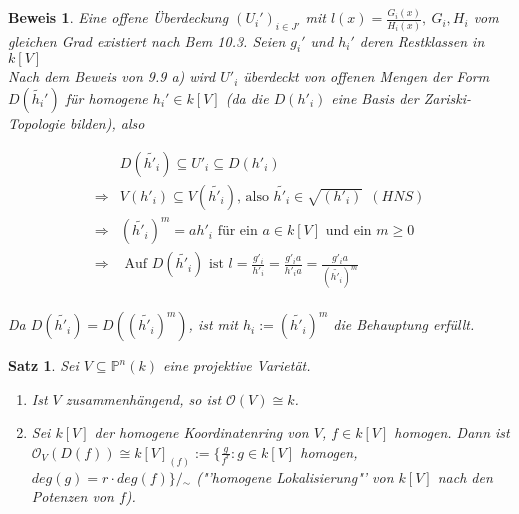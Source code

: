\documentclass[a4paper,12pt]{report}
\theoremstyle{break}
\newtheorem{Satz}{Satz}
\theoremstyle{nonumberbreak}
\theoremstyle{nonumberplain}
\newtheorem{Bew}{Beweis}
\begin{document}
\begin{Bew}
Eine offene Überdeckung $(U_i')_{i\in J'}$ mit $l(x)=\frac{G_i(x)}{H_i(x)},~G_i,H_i$ vom gleichen Grad existiert nach Bem 10.3. Seien $g_i'$ und $h_i'$ deren Restklassen in $k[V]$\\
Nach dem Beweis von 9.9 a) wird $U'_i$ überdeckt von offenen Mengen der Form $D(\tilde{h_i}')$ für homogene $h_i'\in k[V]$ (da die $D(h'_i)$ eine Basis der Zariski-Topologie bilden), also

\begin{align*}
&D(\tilde{h'_i})\subseteq U'_i\subseteq D(h'_i)~\\
\Rightarrow & V(h'_i)\subseteq V(\tilde{h'_i})  \text{, also } \tilde{h'_i}\in\sqrt{(h'_i)} ~~ (HNS)\\
\Rightarrow & (\tilde{h'_i})^m=ah'_i  \text{ für ein } a\in k[V] \text{ und ein } m\geq 0\\
\Rightarrow & \text{ Auf } D(\tilde{h'_i}) \text{ ist } l=\frac{g'_i}{h'_i}=\frac{g'_ia}{h'_ia}=\frac{g'_ia}{(\tilde{h'_i})^m}\\
\end{align*}

Da $D(\tilde{h'_i})=D((\tilde{h'_i})^m)$, ist mit $h_i:=(\tilde{h'_i})^m$ die Behauptung erfüllt.
\end{Bew}


\begin{Satz}
Sei $V\subseteq \mathbb{P}^n(k)$ eine projektive Varietät.
\begin{enumerate}
\item Ist $V$ zusammenhängend, so ist $\mathcal{O}(V)\cong k$.
\item Sei $k[V]$ der homogene Koordinatenring von $V$, $f\in k[V]$ homogen. Dann ist
$\mathcal{O}_V(D(f))\cong k[V]_{(f)}:= \{\frac{g}{f^r}: g\in k[V]$ homogen, $deg(g)=r\cdot deg(f)\}/\!\!{}_\sim$
("'homogene Lokalisierung"' von $k[V]$ nach den Potenzen von $f$).
\end{enumerate}
\end{Satz}
\end{document}
